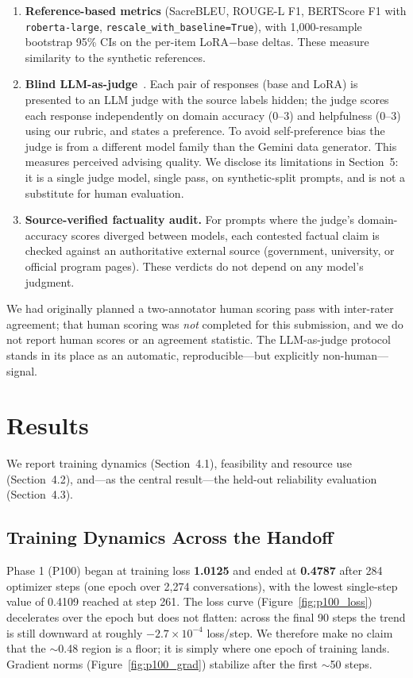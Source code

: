 \documentclass[11pt, a4paper]{article}
\begin{document}
\begin{enumerate}
    \item \textbf{Reference-based metrics} (SacreBLEU, ROUGE-L F1, BERTScore F1 with \texttt{roberta-large}, \texttt{rescale\_with\_baseline=True}), with 1{,}000-resample bootstrap 95\% CIs on the per-item LoRA$-$base deltas. These measure similarity to the synthetic references.
    \item \textbf{Blind LLM-as-judge}~\cite{zheng2023}. Each pair of responses (base and LoRA) is presented to an LLM judge with the source labels hidden; the judge scores each response independently on domain accuracy (0--3) and helpfulness (0--3) using our rubric, and states a preference. To avoid self-preference bias the judge is from a different model family than the Gemini data generator. This measures perceived advising quality. We disclose its limitations in Section~5: it is a single judge model, single pass, on synthetic-split prompts, and is not a substitute for human evaluation.
    \item \textbf{Source-verified factuality audit.} For prompts where the judge's domain-accuracy scores diverged between models, each contested factual claim is checked against an authoritative external source (government, university, or official program pages). These verdicts do not depend on any model's judgment.
\end{enumerate}

We had originally planned a two-annotator human scoring pass with inter-rater agreement; that human scoring was \emph{not} completed for this submission, and we do not report human scores or an agreement statistic. The LLM-as-judge protocol stands in its place as an automatic, reproducible---but explicitly non-human---signal.

\section{Results}

We report training dynamics (Section~4.1), feasibility and resource use (Section~4.2), and---as the central result---the held-out reliability evaluation (Section~4.3).

\subsection{Training Dynamics Across the Handoff}
\label{sec:dynamics}
Phase 1 (P100) began at training loss \textbf{1.0125} and ended at \textbf{0.4787} after 284 optimizer steps (one epoch over 2{,}274 conversations), with the lowest single-step value of 0.4109 reached at step 261. The loss curve (Figure~\ref{fig:p100_loss}) decelerates over the epoch but does not flatten: across the final 90 steps the trend is still downward at roughly $-2.7\times10^{-4}$ loss/step. We therefore make no claim that the $\sim$0.48 region is a floor; it is simply where one epoch of training lands. Gradient norms (Figure~\ref{fig:p100_grad}) stabilize after the first $\sim$50 steps.
\end{document}
